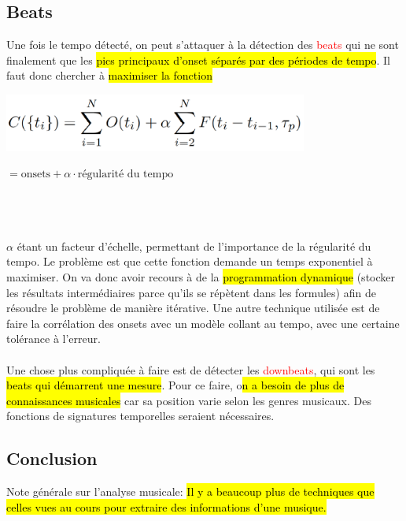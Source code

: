 \documentclass[letterpaper, 12pt]{article}
\newcommand{\alinea}{
\hspace*{0.5cm}}
\newcommand{\red}[1]{
	\textcolor{red}{#1}}
\begin{document}
		\subsection{Beats}
			\alinea Une fois le tempo détecté, on peut s'attaquer à la détection des \red{beats} qui ne sont finalement que les 
				\hl{pics principaux d'onset séparés par des périodes de tempo}. Il faut donc chercher à \hl{maximiser la fonction}\\
				\begin{minipage}{0.5\textwidth}
					\begin{flushright}
						\includegraphics[width=0.75\textwidth]{Images/beat-eq}
					\end{flushright}
				\end{minipage} \hfill
				\begin{minipage}{0.49\textwidth}
					\begin{flushleft}
						$ = \text{onsets} + \alpha \cdot \text{régularité du tempo} $
					\end{flushleft}
				\end{minipage}~\\~\\~\\				
				$\alpha$ étant un facteur d'échelle, permettant de l'importance de la régularité du tempo. Le problème est que 
				cette fonction demande un temps exponentiel à maximiser. On va donc avoir recours à de la \hl{programmation dynamique}
				(stocker les résultats intermédiaires parce qu'ils se répètent dans les formules) afin de résoudre le problème
				de manière itérative. Une autre technique utilisée est de faire la corrélation des onsets avec un modèle collant au 
				tempo, avec une certaine tolérance à l'erreur.\\
			~\\
			\alinea Une chose plus compliquée à faire est de détecter les \red{downbeats}, qui sont les \hl{beats qui démarrent une mesure}.
				Pour ce faire, o\hl{n a besoin de plus de connaissances musicales} car sa position varie selon les genres musicaux.
				Des fonctions de signatures temporelles seraient nécessaires.
		\subsection{Conclusion}		
			\alinea Note générale sur l'analyse musicale: 
				\hl{Il y a beaucoup plus de techniques que celles vues au cours pour extraire des informations d'une musique.}
\end{document}
